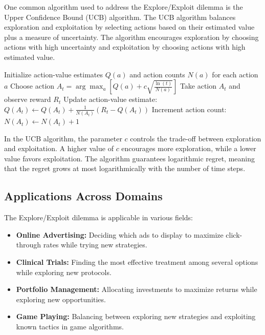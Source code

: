 \documentclass[12pt]{book} %
\begin{document}
One common algorithm used to address the Explore/Exploit dilemma is the Upper Confidence Bound (UCB) algorithm. The UCB algorithm balances exploration and exploitation by selecting actions based on their estimated value plus a measure of uncertainty. The algorithm encourages exploration by choosing actions with high uncertainty and exploitation by choosing actions with high estimated value.
\FloatBarrier
\begin{algorithm}
\caption{Upper Confidence Bound (UCB) Algorithm}
\begin{algorithmic}[1]
\State Initialize action-value estimates $Q(a)$ and action counts $N(a)$ for each action $a$
\State Choose action $A_t = \arg\max_a \left[Q(a) + c \sqrt{\frac{\ln(t)}{N(a)}}\right]$ 
\State Take action $A_t$ and observe reward $R_t$
\State Update action-value estimate: $Q(A_t) \gets Q(A_t) + \frac{1}{N(A_t)}(R_t - Q(A_t))$
\State Increment action count: $N(A_t) \gets N(A_t) + 1$
\EndFor
\end{algorithmic}
\end{algorithm}
\FloatBarrier
In the UCB algorithm, the parameter $c$ controls the trade-off between exploration and exploitation. A higher value of $c$ encourages more exploration, while a lower value favors exploitation. The algorithm guarantees logarithmic regret, meaning that the regret grows at most logarithmically with the number of time steps.

\FloatBarrier
\subsection{Applications Across Domains}

The Explore/Exploit dilemma is applicable in various fields:

\begin{itemize}
    \item \textbf{Online Advertising:} Deciding which ads to display to maximize click-through rates while trying new strategies.
    \item \textbf{Clinical Trials:} Finding the most effective treatment among several options while exploring new protocols.
    \item \textbf{Portfolio Management:} Allocating investments to maximize returns while exploring new opportunities.
    \item \textbf{Game Playing:} Balancing between exploring new strategies and exploiting known tactics in game algorithms.
\end{itemize}
\end{document}

